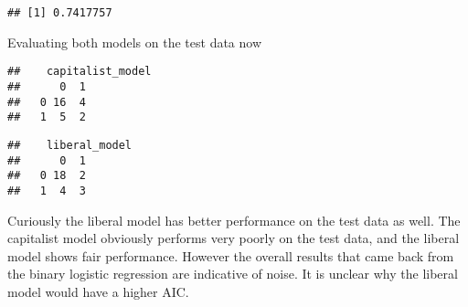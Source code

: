 \documentclass[
]{article}
\newenvironment{Shaded}{\begin{snugshade}}{\end{snugshade}}
\newcommand{\AttributeTok}[1]{\textcolor[rgb]{0.77,0.63,0.00}{#1}}
\newcommand{\DecValTok}[1]{\textcolor[rgb]{0.00,0.00,0.81}{#1}}
\newcommand{\FloatTok}[1]{\textcolor[rgb]{0.00,0.00,0.81}{#1}}
\newcommand{\FunctionTok}[1]{\textcolor[rgb]{0.00,0.00,0.00}{#1}}
\newcommand{\NormalTok}[1]{#1}
\newcommand{\OtherTok}[1]{\textcolor[rgb]{0.56,0.35,0.01}{#1}}
\newcommand{\SpecialCharTok}[1]{\textcolor[rgb]{0.00,0.00,0.00}{#1}}
\newcommand{\StringTok}[1]{\textcolor[rgb]{0.31,0.60,0.02}{#1}}
\begin{document}
\begin{verbatim}
## [1] 0.7417757
\end{verbatim}

Evaluating both models on the test data now

\begin{Shaded}
\end{Shaded}

\begin{verbatim}
##    capitalist_model
##      0  1
##   0 16  4
##   1  5  2
\end{verbatim}

\begin{Shaded}
\end{Shaded}

\begin{verbatim}
##    liberal_model
##      0  1
##   0 18  2
##   1  4  3
\end{verbatim}

Curiously the liberal model has better performance on the test data as
well. The capitalist model obviously performs very poorly on the test
data, and the liberal model shows fair performance. However the overall
results that came back from the binary logistic regression are
indicative of noise. It is unclear why the liberal model would have a
higher AIC.
\end{document}
